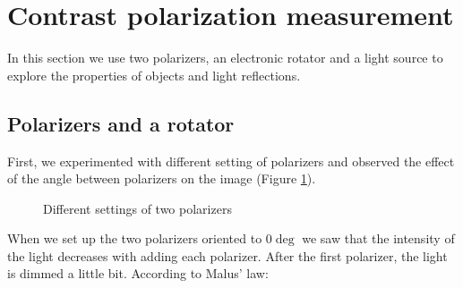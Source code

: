 \documentclass[english]{article}
\begin{document}
\section{Contrast polarization measurement}
In this section we use two polarizers, an electronic rotator and a light source to explore the properties of objects and light reflections.\\

\subsection{Polarizers and a rotator}
First, we experimented with different setting of polarizers and observed the effect of the angle between polarizers on the image (Figure \ref{fig:six}).\\

\begin{figure}[H]
	\centering
	\caption{Different settings of two polarizers}
	\label{fig:six}
\end{figure}
When we set up the two polarizers oriented to $0\deg$ we saw that the intensity of the light decreases with adding each polarizer. 
After the first polarizer, the light is dimmed a little bit. According to Malus' law:
\end{document}
